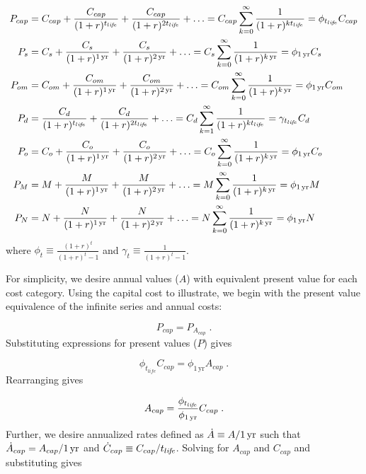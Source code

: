 \begin{align} \label{eq:present_values}
  P_{cap} &= C_{cap} + \frac{C_{cap}}{(1 + r)^{\tlife}} + \frac{C_{cap}}{(1 + r)^{2 \tlife}} + \ldots 
  = C_{cap} \sum_{k = 0}^{\infty} \frac{1}{(1 + r)^{k \tlife}} 
  = \phi_{\tlife} C_{cap} \\
%
  P_s &= C_s + \frac{C_s}{(1 + r)^{\oneyr}} + \frac{C_s}{(1 + r)^{\twoyr}} + \ldots
  = C_s \sum_{k = 0}^{\infty} \frac{1}{(1 + r)^{\kyr}}
  = \phi_{\oneyr} C_s \\
%
  P_{om} &= C_{om} + \frac{C_{om}}{(1 + r)^{\oneyr}} +  \frac{C_{om}}{(1 + r)^{\twoyr}} + \ldots
  = C_{om} \sum_{k = 0}^{\infty} \frac{1}{(1 + r)^{\kyr}}
  = \phi_{\oneyr} C_{om} \\
%
  P_d &= \frac{C_d}{(1 + r)^{\tlife}} + \frac{C_d}{(1 + r)^{2 \tlife}} + \ldots 
  = C_d \sum_{k = 1}^{\infty} \frac{1}{(1 + r)^{k \tlife}} 
  = \gamma_{\tlife} C_d \\
%
  P_o &= C_o + \frac{C_o}{(1 + r)^{\oneyr}} + \frac{C_o}{(1 + r)^{\twoyr}} + \ldots
  = C_o \sum_{k = 0}^{\infty} \frac{1}{(1 + r)^{\kyr}}
  = \phi_{\oneyr} C_o \\
%
  P_M &= M + \frac{M}{(1 + r)^{\oneyr}} + \frac{M}{(1 + r)^{\twoyr}} + \ldots
  = M \sum_{k = 0}^{\infty} \frac{1}{(1 + r)^{\kyr}}
  = \phi_{\oneyr} M \\
%
  P_N &= N + \frac{N}{(1 + r)^{\oneyr}} + \frac{N}{(1 + r)^{\twoyr}} + \ldots
  = N \sum_{k = 0}^{\infty} \frac{1}{(1 + r)^{\kyr}}
  = \phi_{\oneyr} N
\end{align}
%
where $\phi_t \equiv \frac{(1 + r)^t}{(1 + r)^t - 1}$
and $\gamma_t \equiv \frac{1}{(1 + r)^t - 1}$.

For simplicity, we desire annual values ($A$)
with equivalent present value for each cost category. 
Using the capital cost to illustrate, 
we begin with the present value equivalence of the infinite series and 
annual costs:

\begin{equation}
  P_{cap} = P_{A_{cap}} \; .
\end{equation}
%
Substituting expressions for present values ($P$) gives

\begin{equation}
  \phi_{t_{life}} C_{cap} = \phi_{1\,\mathrm{yr}} A_{cap} \; .
\end{equation}
%
Rearranging gives

\begin{equation}
  A_{cap} = \frac{\phi_{t_{li\!f\!e}}}{\phi_{1\,\mathrm{yr}}} C_{cap} \; .
\end{equation}
%
Further, we desire annualized rates defined as
$\dot{A} \equiv A/1\,\mathrm{yr}$ such that
$\dot{A}_{cap} = A_{cap}/1\,\mathrm{yr}$
and 
$\dot{C}_{cap} \equiv C_{cap}/t_{li\!f\!e}$.
Solving for $A_{cap}$ and $C_{cap}$ and substituting gives


